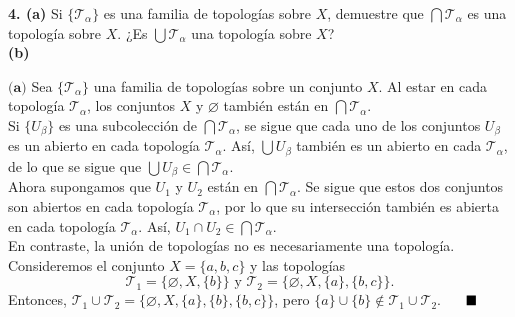 \documentclass{article}
\begin{document}
\begin{mybox}
	\textbf{4. (a)} Si $\{ \mathcal{T_{\alpha}} \}$ es una familia de topologías sobre $X$, demuestre que $\bigcap \mathcal{T_{\alpha}}$ es una topología sobre $X$.  ¿Es $\bigcup \mathcal{T}_{\alpha}$ una topología sobre $X$? \\
	
	\textbf{(b) } 
\end{mybox}	

$ \textbf{(a)}$ Sea $\{ \mathcal{T_{\alpha}}\}$ una familia de topologías sobre un conjunto $X$. Al estar en cada topología $\mathcal{T_{\alpha}}$, los conjuntos $X$ y $\varnothing$ también están en $\bigcap \mathcal{T_{\alpha}}$. \\
Si $\{U_{\beta} \}$ es una subcolección de $ \bigcap \mathcal{T}_{\alpha}$, se sigue que cada uno de los conjuntos $U_{\beta}$ es un abierto en cada topología $\mathcal{T_{\alpha}}$. Así, $\bigcup U_{\beta}$ también es un abierto en cada $\mathcal{T}_{\alpha}$, de lo que se sigue que $\bigcup U_{\beta} \in \bigcap \mathcal{T}_{\alpha}.$ \\
Ahora supongamos que $U_{1}$ y $U_{2}$ están en $\bigcap \mathcal{T_{\alpha}}$. Se sigue que estos dos conjuntos son abiertos en cada topología $\mathcal{T}_{\alpha}$, por lo que su intersección también es abierta en cada topología $\mathcal{T}_{\alpha}$. Así, $U_{1} \cap U_{2} \in \bigcap \mathcal{T_{\alpha}}$. \\

En contraste, la unión de topologías no es necesariamente una topología. Consideremos el conjunto $X = \{ a, b, c\}$ y las topologías
$$ \mathcal{T}_{1} = \{ \varnothing, X, \{ b \}  \} \text{ y  } \mathcal{T}_{2} = \{ \varnothing, X, \{ a \}, \{ b, c \}  \} .$$
Entonces, $\mathcal{T}_{1} \cup \mathcal{T}_{2} = \{ \varnothing, X, \{ a \}, \{ b \}, \{ b, c \} \}$, pero $\{ a \} \cup \{ b \} \notin \mathcal{T}_{1} \cup \mathcal{T}_{2}$. $\hspace{0.5cm} \blacksquare$
\end{document}
